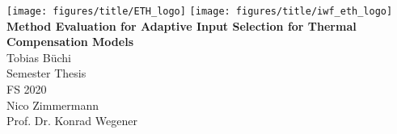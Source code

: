 \documentclass[paper=a4,twoside=true,fontsize=11pt,numbers=noendperiod,chapterprefix=false]{scrbook}
\begin{document}
%


\newcommand{\mykeyword}[0]{my long text}
\newcommand{\chpref}[1]{Chapter \ref{#1}}
\newcommand{\secref}[1]{Section \ref{#1}}
\newcommand{\figref}[1]{Figure \ref{#1}}
\newcommand{\tabref}[1]{Table \ref{#1}}
\newcommand{\apxref}[1]{Appendix \ref{#1}}

\setcounter{page}{-1}  %
\begin{titlepage}
	\topmargin -3.8cm
	\oddsidemargin 0.0cm
	\evensidemargin 0.0cm
	\centering
	\texttt{[image: figures/title/ETH\_logo]} \hfill
	\texttt{[image: figures/title/iwf\_eth\_logo]} \\
	\vspace{7.2cm} %
	\Huge
	\textbf{\textsf{Method Evaluation for Adaptive Input Selection for Thermal Compensation Models}} \\[2.0cm]
	\vspace{4.0cm} %
	\sffamily
	\Large
	Tobias Büchi
	\\[0.8cm]
	\large
	Semester Thesis
	\\
	FS 2020
	\\[0.8cm] %
	Nico Zimmermann 
	\\[0.5cm]
	Prof. Dr. Konrad Wegener
	\vfill
\end{titlepage}
\clearemptydoublepage
\end{document}
